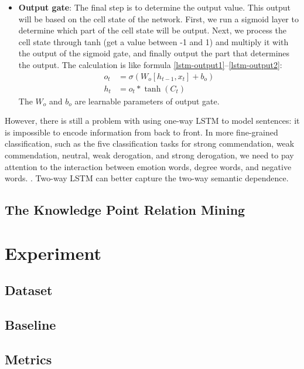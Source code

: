 \begin{itemize}
	\item \textbf{Output gate}: The final step is to determine the output value. This output will be based on the cell state of the network. First, we run a sigmoid layer to determine which part of the cell state will be output. Next, we process the cell state through tanh (get a value between -1 and 1) and multiply it with the output of the sigmoid gate, and finally output the part that determines the output. The calculation is like formula \ref{lstm-output1}--\ref{lstm-output2}: 
	\begin{align}
		o_{t}&=\sigma\left(W_{o}\left[h_{t-1}, x_{t}\right]+b_{o}\right) \label{lstm-output1}\\
		h_{t}&=o_{t} * \tanh \left(C_{t}\right) \label{lstm-output2}
	\end{align}
	The $W_o$ and $b_o$ are learnable parameters of output gate.
\end{itemize}

However, there is still a problem with using one-way LSTM to model sentences: it is impossible to encode information from back to front. In more fine-grained classification, such as the five classification tasks for strong commendation, weak commendation, neutral, weak derogation, and strong derogation, we need to pay attention to the interaction between emotion words, degree words, and negative words. . Two-way LSTM can better capture the two-way semantic dependence. 

\subsection{The Knowledge Point Relation Mining}

\section{Experiment}

\subsection{Dataset}

\subsection{Baseline}

\subsection{Metrics}

